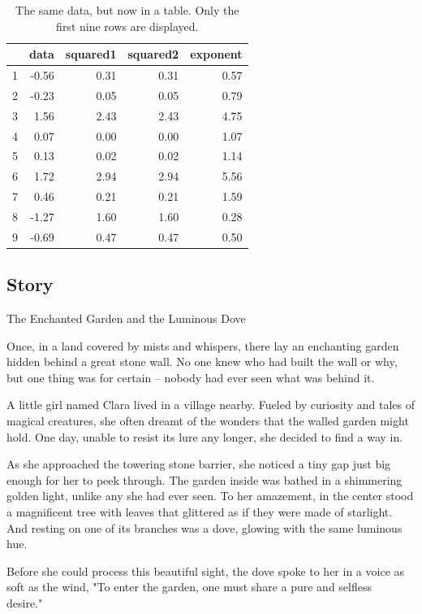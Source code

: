 \documentclass[10pt, fullpage, a4paper, titlepage]{article}
\begin{document}
\begin{table}[ht]
\caption{The same data, but now in a table. Only the first nine rows are displayed.}
\centering
\begin{tabular}{rrrrr}
  \hline
 & data & squared1 & squared2 & exponent \\ 
  \hline
1 & -0.56 & 0.31 & 0.31 & 0.57 \\ 
  2 & -0.23 & 0.05 & 0.05 & 0.79 \\ 
  3 & 1.56 & 2.43 & 2.43 & 4.75 \\ 
  4 & 0.07 & 0.00 & 0.00 & 1.07 \\ 
  5 & 0.13 & 0.02 & 0.02 & 1.14 \\ 
  6 & 1.72 & 2.94 & 2.94 & 5.56 \\ 
  7 & 0.46 & 0.21 & 0.21 & 1.59 \\ 
  8 & -1.27 & 1.60 & 1.60 & 0.28 \\ 
  9 & -0.69 & 0.47 & 0.47 & 0.50 \\ 
   \hline
\end{tabular}
\end{table}
\subsection{Story}
The Enchanted Garden and the Luminous Dove\

Once, in a land covered by mists and whispers, there lay an enchanting garden hidden behind a great stone wall. No one knew who had built the wall or why, but one thing was for certain – nobody had ever seen what was behind it.\

A little girl named Clara lived in a village nearby. Fueled by curiosity and tales of magical creatures, she often dreamt of the wonders that the walled garden might hold. One day, unable to resist its lure any longer, she decided to find a way in.\

As she approached the towering stone barrier, she noticed a tiny gap just big enough for her to peek through. The garden inside was bathed in a shimmering golden light, unlike any she had ever seen. To her amazement, in the center stood a magnificent tree with leaves that glittered as if they were made of starlight. And resting on one of its branches was a dove, glowing with the same luminous hue.\

Before she could process this beautiful sight, the dove spoke to her in a voice as soft as the wind, "To enter the garden, one must share a pure and selfless desire."\
\end{document}
